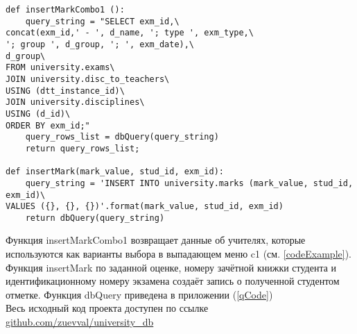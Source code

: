 \documentclass[zuevDbReport.tex]{subfiles}
\begin{document}
\begin{lstlisting}
def insertMarkCombo1 ():
    query_string = "SELECT exm_id,\
concat(exm_id,' - ', d_name, '; type ', exm_type,\
'; group ', d_group, '; ', exm_date),\
d_group\
FROM university.exams\
JOIN university.disc_to_teachers\
USING (dtt_instance_id)\
JOIN university.disciplines\
USING (d_id)\
ORDER BY exm_id;"
    query_rows_list = dbQuery(query_string)
    return query_rows_list;

def insertMark(mark_value, stud_id, exm_id):
    query_string = 'INSERT INTO university.marks (mark_value, stud_id, exm_id)\
VALUES ({}, {}, {})'.format(mark_value, stud_id, exm_id)
    return dbQuery(query_string)
\end{lstlisting}
Функция insertMarkCombo1 возвращает данные об учителях, которые используются как варианты выбора в выпадающем меню c1 (см. \ref{codeExample}). Функция insertMark по заданной оценке, номеру зачётной книжки студента и идентификационному номеру экзамена создаёт запись о полученной студентом отметке.
Функция dbQuery приведена в приложении (\ref{qCode})\\
Весь исходный код проекта доступен по ссылке \href{https://github.com/zuevval/university\_db}{github.com/zuevval/university\_db}
\end{document}
